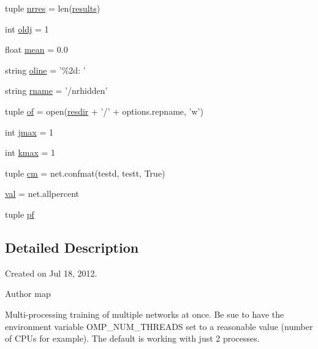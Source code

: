 \begin{DoxyCompactItemize}
\item 
tuple \hyperlink{namespacetrainnetmp_aeaf295e503c8c7a7eb9d4e5a77ed5499}{nrres} = len(\hyperlink{namespacetrainnetmp_acf60722e6b94f8b6613aff40c374d19f}{results})
\item 
int \hyperlink{namespacetrainnetmp_a645db8b07923a52025222af462801dc2}{oldj} = 1
\item 
float \hyperlink{namespacetrainnetmp_a8647e1123b531e4df1080e929f352389}{mean} = 0.0
\item 
string \hyperlink{namespacetrainnetmp_a0fc6d0db466612f63fa6df1c682394d0}{oline} = '\%2d: '
\item 
string \hyperlink{namespacetrainnetmp_a01a4fd22ee2cc1aba08b4566d95bb2a4}{rname} = '/nrhidden'
\item 
tuple \hyperlink{namespacetrainnetmp_a5348e04a55d2a7563398585f1b851efa}{of} = open(\hyperlink{namespacetrainnetmp_ab566ffaeaa6913a2b2b347cff1a608a4}{resdir} + '/' + options.repname, 'w')
\item 
int \hyperlink{namespacetrainnetmp_aa4405feef7b967d4eb9749579d3b1dad}{jmax} = 1
\item 
int \hyperlink{namespacetrainnetmp_a8c5a189bb47054d719066421ae589642}{kmax} = 1
\item 
tuple \hyperlink{namespacetrainnetmp_af36e6597c6ab86263c1f5da739583e3f}{cm} = net.confmat(testd, testt, True)
\item 
\hyperlink{namespacetrainnetmp_a72596b0af8ecedd242cba70b6819b03d}{val} = net.allpercent
\item 
tuple \hyperlink{namespacetrainnetmp_a6b1fd4837c9650e7f0526c5e9b88fc05}{pf}
\end{DoxyCompactItemize}


\subsection{Detailed Description}
Created on Jul 18, 2012. \begin{DoxyAuthor}{Author}
map 
\end{DoxyAuthor}
Multi-\/processing training of multiple networks at once. Be sue to have the environment variable OMP\_\-NUM\_\-THREADS set to a reasonable value (number of CPUs for example). The default is working with just 2 processes.

